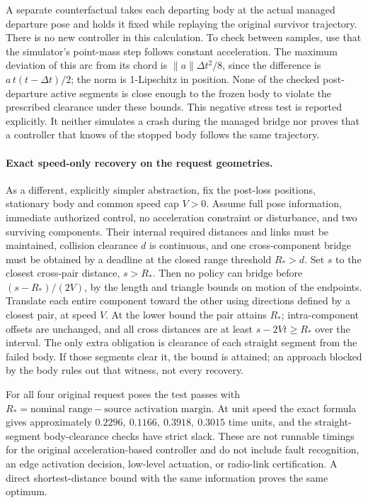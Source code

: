 \documentclass{article}
\begin{document}
A separate counterfactual takes each departing body at the actual managed departure pose and holds it fixed while replaying the original survivor trajectory. There is no new controller in this calculation. To check between samples, use that the simulator's point-mass step follows constant acceleration. The maximum deviation of this arc from its chord is \(\|a\|\Delta t^2/8\), since the difference is \(a\,t(t-\Delta t)/2\); the norm is 1-Lipschitz in position. None of the checked post-departure active segments is close enough to the frozen body to violate the prescribed clearance under these bounds. This negative stress test is reported explicitly. It neither simulates a crash during the managed bridge nor proves that a controller that knows of the stopped body follows the same trajectory.

\paragraph{Exact speed-only recovery on the request geometries.}
As a different, explicitly simpler abstraction, fix the post-loss positions, stationary body and common speed cap \(V>0\). Assume full pose information, immediate authorized control, no acceleration constraint or disturbance, and two surviving components. Their internal required distances and links must be maintained, collision clearance \(d\) is continuous, and one cross-component bridge must be obtained by a deadline at the closed range threshold \(R_*\!>d\). Set \(s\) to the closest cross-pair distance, \(s>R_*\). Then no policy can bridge before \((s-R_*)/(2V)\), by the length and triangle bounds on motion of the endpoints. Translate each entire component toward the other using directions defined by a closest pair, at speed \(V\). At the lower bound the pair attains \(R_*\); intra-component offsets are unchanged, and all cross distances are at least \(s-2Vt\ge R_*\) over the interval. The only extra obligation is clearance of each straight segment from the failed body. If those segments clear it, the bound is attained; an approach blocked by the body rules out that witness, not every recovery.

For all four original request poses the test passes with \(R_*=\text{nominal range}-\text{source activation margin}\). At unit speed the exact formula gives approximately \(0.2296,\ 0.1166,\ 0.3918,\ 0.3015\) time units, and the straight-segment body-clearance checks have strict slack. These are not runnable timings for the original acceleration-based controller and do not include fault recognition, an edge activation decision, low-level actuation, or radio-link certification. A direct shortest-distance bound with the same information proves the same optimum.
\end{document}
